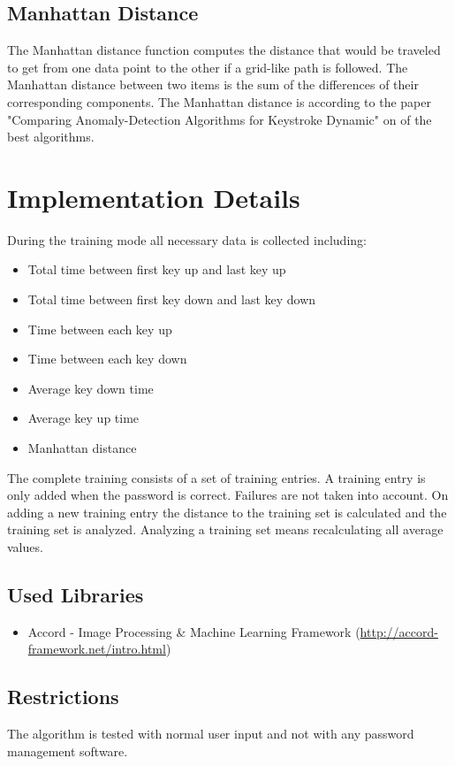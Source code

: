 \documentclass[fleqn,10pt]{SelfArx} %
\begin{document}
\subsection{Manhattan Distance}
The Manhattan distance function computes the distance that would be traveled to get from one data point to the other if a grid-like path is followed. The Manhattan distance between two items is the sum of the differences of their corresponding components\cite{manhattan}.
\newline
The Manhattan distance is according to the paper "Comparing Anomaly-Detection Algorithms for Keystroke Dynamic" \cite{Figueredo:2009dg} on of the best algorithms. 

\section{Implementation Details}
During the training mode all necessary data is collected including:
\begin{itemize}
  \item Total time between first key up and last key up
  \item Total time between first key down and last key down
  \item Time between each key up
  \item Time between each key down
  \item Average key down time
  \item Average key up time
  \item Manhattan distance
\end{itemize}
The complete training consists of a set of training entries. A training entry is only added when the password is correct. Failures are not taken into account. On adding a new training entry the distance to the training set is calculated and the training set is analyzed. Analyzing a training set means recalculating all average values.

\subsection{Used Libraries}
\begin{itemize}
  \item Accord - Image Processing \& Machine Learning Framework (\url{http://accord-framework.net/intro.html})
\end{itemize}

\subsection{Restrictions}
The algorithm is tested with normal user input and not with any password management software.
\end{document}
